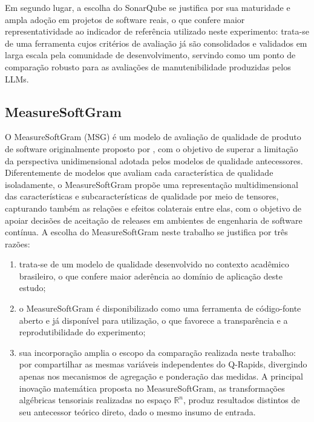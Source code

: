 Em segundo lugar, a escolha do SonarQube se justifica por sua maturidade e ampla adoção em projetos de software reais, o que confere maior representatividade ao indicador de referência utilizado neste experimento: trata-se de uma ferramenta cujos critérios de avaliação já são consolidados e validados em larga escala pela comunidade de desenvolvimento, servindo como um ponto de comparação robusto para as avaliações de manutenibilidade produzidas pelos LLMs.

\subsection{MeasureSoftGram}
\label{sec:msg_justificativa}

O MeasureSoftGram (MSG) é um modelo de avaliação de qualidade de produto de software originalmente proposto por , com o objetivo de superar a limitação da perspectiva unidimensional adotada pelos modelos de qualidade antecessores. Diferentemente de modelos que avaliam cada característica de qualidade isoladamente, o MeasureSoftGram propõe uma representação multidimensional das características e subcaracterísticas de qualidade por meio de tensores, capturando também as relações e efeitos colaterais entre elas, com o objetivo de apoiar decisões de aceitação de releases em ambientes de engenharia de software contínua. A escolha do MeasureSoftGram neste trabalho se justifica por três razões:

\begin{enumerate}[leftmargin=2\parindent]
	\item trata-se de um modelo de qualidade desenvolvido no contexto acadêmico brasileiro, o que confere maior aderência ao domínio de aplicação deste estudo;
	
	\item o MeasureSoftGram é disponibilizado como uma ferramenta de código-fonte aberto e já disponível para utilização, o que favorece a transparência e a reprodutibilidade do experimento;
	
	\item sua incorporação amplia o escopo da comparação realizada neste trabalho: por compartilhar as mesmas variáveis independentes do Q-Rapids, divergindo apenas nos mecanismos de agregação e ponderação das medidas. A principal inovação matemática proposta no MeasureSoftGram, as transformações algébricas tensoriais realizadas no espaço $\mathbb{R}^n$, produz resultados distintos de seu antecessor teórico direto, dado o mesmo insumo de entrada.
\end{enumerate}


